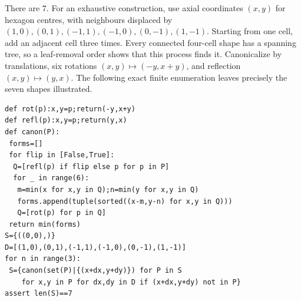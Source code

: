There are $\boxed7$. For an exhaustive construction, use axial coordinates $(x,y)$ for hexagon centres, with neighbours displaced by $(1,0),(0,1),(-1,1),(-1,0),(0,-1),(1,-1)$. Starting from one cell, add an adjacent cell three times. Every connected four-cell shape has a spanning tree, so a leaf-removal order shows that this process finds it. Canonicalize by translations, six rotations $(x,y)\mapsto(-y,x+y)$, and reflection $(x,y)\mapsto(y,x)$. The following exact finite enumeration leaves precisely the seven shapes illustrated.
\begin{verbatim}
def rot(p):x,y=p;return(-y,x+y)
def refl(p):x,y=p;return(y,x)
def canon(P):
 forms=[]
 for flip in [False,True]:
  Q=[refl(p) if flip else p for p in P]
  for _ in range(6):
   m=min(x for x,y in Q);n=min(y for x,y in Q)
   forms.append(tuple(sorted((x-m,y-n) for x,y in Q)))
   Q=[rot(p) for p in Q]
 return min(forms)
S={((0,0),)}
D=[(1,0),(0,1),(-1,1),(-1,0),(0,-1),(1,-1)]
for n in range(3):
 S={canon(set(P)|{(x+dx,y+dy)}) for P in S
    for x,y in P for dx,dy in D if (x+dx,y+dy) not in P}
assert len(S)==7
\end{verbatim}

